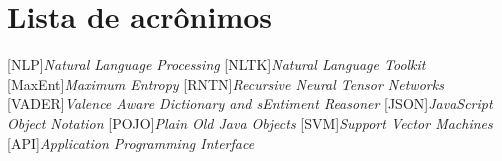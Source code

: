 \chapter*{Lista de acrônimos}

\vspace{20px}
\begin{acronym}[XXXXXXXXXX]
[NLP]{\textit{Natural Language Processing}}
[NLTK]{\textit{Natural Language Toolkit}}
[MaxEnt]{\textit{Maximum Entropy}}
[RNTN]{\textit{Recursive Neural Tensor Networks}}
[VADER]{\textit{Valence Aware Dictionary and sEntiment Reasoner}}
[JSON]{\textit{JavaScript Object Notation}}
[POJO]{\textit{Plain Old Java Objects}}
[SVM]{\textit{Support Vector Machines}}
[API]{\textit{Application Programming Interface}}
\end{acronym}